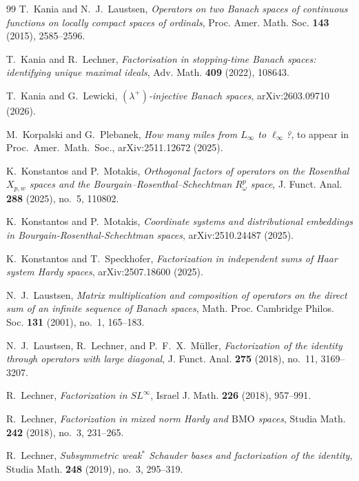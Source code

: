 \documentclass[11pt]{amsart}
\theoremstyle{plain}
\theoremstyle{definition}
\numberwithin{equation}{section}
\begin{document}
\begin{thebibliography}{99}
T.~Kania and N.~J.~Laustsen,
\emph{Operators on two Banach spaces of continuous functions on locally compact spaces of ordinals},
Proc. Amer. Math. Soc. \textbf{143} (2015), 2585--2596.

T.~Kania and R.~Lechner,
\emph{Factorisation in stopping-time Banach spaces: identifying unique maximal ideals},
Adv. Math. \textbf{409} (2022), 108643.

T.~Kania and G.~Lewicki,
\emph{$(\lambda^+)$-injective Banach spaces},
arXiv:2603.09710 (2026).

M.~Korpalski and G.~Plebanek,
\emph{How many miles from $L_\infty$ to $\ell_\infty$?}, to appear in Proc.~Amer.~Math.~Soc., 
arXiv:2511.12672 (2025).

K.~Konstantos and P.~Motakis,
\emph{Orthogonal factors of operators on the Rosenthal $X_{p,w}$ spaces and the Bourgain--Rosenthal--Schechtman $R_\omega^p$ space},
J. Funct. Anal. \textbf{288} (2025), no.~5, 110802.

K.~Konstantos and P.~Motakis,
\emph{Coordinate systems and distributional embeddings in Bourgain-Rosenthal-Schechtman spaces},
arXiv:2510.24487 (2025).

K.~Konstantos and T.~Speckhofer,
\emph{Factorization in independent sums of Haar system Hardy spaces},
arXiv:2507.18600 (2025).

N.~J.~Laustsen,
\emph{Matrix multiplication and composition of operators on the direct sum of an infinite sequence of Banach spaces},
Math. Proc. Cambridge Philos. Soc. \textbf{131} (2001), no.~1, 165--183.

N.~J.~Laustsen, R.~Lechner, and P.~F.~X.~M\"uller,
\emph{Factorization of the identity through operators with large diagonal},
J. Funct. Anal. \textbf{275} (2018), no.~11, 3169--3207.

R.~Lechner,
\emph{Factorization in $SL^\infty$},
Israel J. Math. \textbf{226} (2018), 957--991.

R.~Lechner,
\emph{Factorization in mixed norm Hardy and $\mathrm{BMO}$ spaces},
Studia Math. \textbf{242} (2018), no.~3, 231--265.

R.~Lechner,
\emph{Subsymmetric weak$^*$ Schauder bases and factorization of the identity},
Studia Math. \textbf{248} (2019), no.~3, 295--319.


\end{thebibliography}
\end{document}
